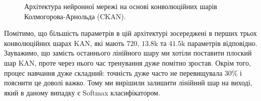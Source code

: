 \begin{figure}
    \caption{Архітектура нейронної мережі на основі конволюційних шарів 
    Колмогорова-Арнольда (CKAN).}
    \label{fig:kan-arch}
\end{figure}

Помітимо, що більшість параметрів в цій архітектурі зосереджені в перших трьох
конволюційних шарах KAN, які мають $720$, $13.8$k та $41.5$k параметрів
відповідно. Зауважимо, що замість останнього лінійного шару ми хотіли поставити
плоский шар KAN, проте через нього час тренування дуже помітно зростав. Окрім
того, процес навчання дуже складний: точність дуже часто не перевищувала 30\% і
пояснити це доволі важко. Тому ми вирішили залишити лінійний шар на виході, який
в даному випадку є Softmax класифікатором.


